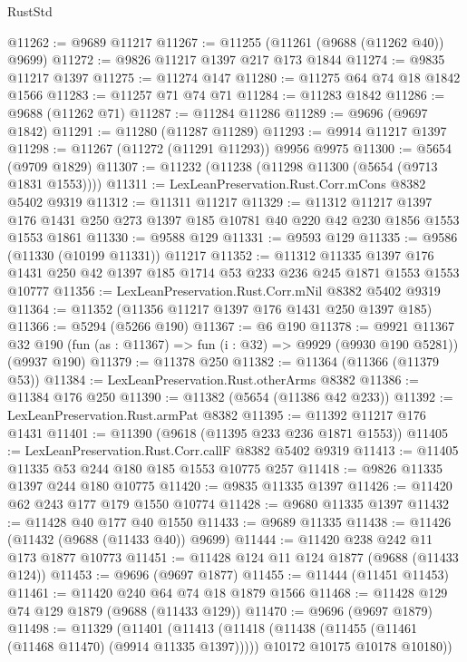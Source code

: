 \begin{lexlean}{RustStd}
\begin{coremodule}
@11262 := @9689 @11217
@11267 := @11255 (@11261 (@9688 (@11262 @40)) @9699)
@11272 := @9826 @11217 @1397 @217 @173 @1844
@11274 := @9835 @11217 @1397
@11275 := @11274 @147
@11280 := @11275 @64 @74 @18 @1842 @1566
@11283 := @11257 @71 @74 @71
@11284 := @11283 @1842
@11286 := @9688 (@11262 @71)
@11287 := @11284 @11286
@11289 := @9696 (@9697 @1842)
@11291 := @11280 (@11287 @11289)
@11293 := @9914 @11217 @1397
@11298 := @11267 (@11272 (@11291 @11293)) @9956 @9975
@11300 := @5654 (@9709 @1829)
@11307 := @11232 (@11238 (@11298 @11300 (@5654 (@9713 @1831 @1553))))
@11311 := LexLeanPreservation.Rust.Corr.mCons @8382 @5402 @9319
@11312 := @11311 @11217
@11329 := @11312
    @11217
    @1397
    @176
    @1431
    @250
    @273
    @1397
    @185
    @10781
    @40
    @220
    @42
    @230
    @1856
    @1553
    @1553
    @1861
@11330 := @9588 @129
@11331 := @9593 @129
@11335 := @9586 (@11330 (@10199 @11331)) @11217
@11352 := @11312
    @11335
    @1397
    @176
    @1431
    @250
    @42
    @1397
    @185
    @1714
    @53
    @233
    @236
    @245
    @1871
    @1553
    @1553
    @10777
@11356 := LexLeanPreservation.Rust.Corr.mNil @8382 @5402 @9319
@11364 := @11352 (@11356 @11217 @1397 @176 @1431 @250 @1397 @185)
@11366 := @5294 (@5266 @190)
@11367 := @6 @190
@11378 := @9921
    @11367
    @32
    @190
    (fun (as : @11367) => fun (i : @32) => @9929 (@9930 @190 @5281))
    (@9937 @190)
@11379 := @11378 @250
@11382 := @11364 (@11366 (@11379 @53))
@11384 := LexLeanPreservation.Rust.otherArms @8382
@11386 := @11384 @176 @250
@11390 := @11382 (@5654 (@11386 @42 @233))
@11392 := LexLeanPreservation.Rust.armPat @8382
@11395 := @11392 @11217 @176 @1431
@11401 := @11390 (@9618 (@11395 @233 @236 @1871 @1553))
@11405 := LexLeanPreservation.Rust.Corr.callF @8382 @5402 @9319
@11413 := @11405 @11335 @53 @244 @180 @185 @1553 @10775 @257
@11418 := @9826 @11335 @1397 @244 @180 @10775
@11420 := @9835 @11335 @1397
@11426 := @11420 @62 @243 @177 @179 @1550 @10774
@11428 := @9680 @11335 @1397
@11432 := @11428 @40 @177 @40 @1550
@11433 := @9689 @11335
@11438 := @11426 (@11432 (@9688 (@11433 @40)) @9699)
@11444 := @11420 @238 @242 @11 @173 @1877 @10773
@11451 := @11428 @124 @11 @124 @1877 (@9688 (@11433 @124))
@11453 := @9696 (@9697 @1877)
@11455 := @11444 (@11451 @11453)
@11461 := @11420 @240 @64 @74 @18 @1879 @1566
@11468 := @11428 @129 @74 @129 @1879 (@9688 (@11433 @129))
@11470 := @9696 (@9697 @1879)
@11498 := @11329
    (@11401
      (@11413
        (@11418 (@11438 (@11455 (@11461 (@11468 @11470) (@9914 @11335 @1397)))))
        @10172
        @10175
        @10178
        @10180))

\end{coremodule}
\end{lexlean}
